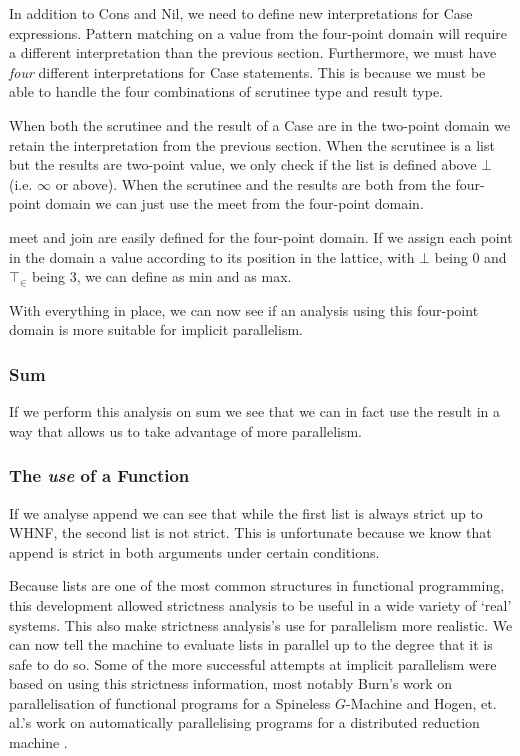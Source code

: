 In addition to \<Cons\> and \<Nil\>, we need to define new interpretations
for \<Case\> expressions. Pattern matching on a value from the four-point
domain will require a different interpretation than the previous section.
Furthermore, we must have \emph{four} different interpretations for \<Case\>
statements. This is because we must be able to handle the four combinations
of scrutinee type and result type. 

When both the scrutinee and the result of a \<Case\> are in the two-point
domain we retain the interpretation from the previous section. When the
scrutinee is a list but the results are two-point value, we only check if the
list is defined above $\bot$ (i.e. $\infty$ or above). When the scrutinee and
the results are both from the four-point domain we can just use the \<meet\>
from the four-point domain.


\<meet\> and \<join\> are easily defined for the four-point domain. If we
assign each point in the domain a value according to its position in the lattice,
with $\bot$ being $0$ and $\top_{\in}$ being $3$, we can define \meet as \<min\>
and \join as \<max\>.

With everything in place, we can now see if an analysis using this four-point
domain is more suitable for implicit parallelism.

\subsubsection{Sum}

If we perform this analysis on \<sum\> we see that we can in fact use the
result in a way that allows us to take advantage of more parallelism.

\subsubsection{The \emph{use} of a Function}

If we analyse \<append\> we can see that while the first list is always
strict up to WHNF, the second list is not strict. This is unfortunate because
we know that \<append\> is strict in both arguments under certain conditions.


Because lists are one of the most common structures in functional programming,
this development allowed strictness analysis to be useful in a wide variety of
`real' systems. This also make strictness analysis's use for parallelism more
realistic. We can now tell the machine to evaluate lists in parallel up to the
degree that it is safe to do so. Some of the more successful attempts at
implicit parallelism were based on using this strictness information, most
notably Burn's work on parallelisation of functional programs for a Spineless
$G$-Machine  and Hogen, et. al.'s work on automatically
parallelising programs for a distributed reduction machine
\citep{hogen1992automatic}.


